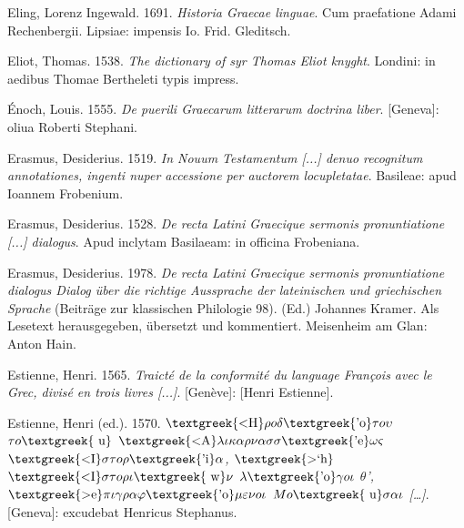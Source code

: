 \begin{styleStandard}
Eling, Lorenz Ingewald. 1691. \textit{Historia Graecae linguae}. Cum praefatione Adami Rechenbergii. Lipsiae: impensis Io. Frid. Gleditsch.
\end{styleStandard}

\begin{styleStandard}
Eliot, Thomas. 1538. \textit{The dictionary of syr Thomas Eliot knyght}. Londini: in aedibus Thomae Bertheleti typis impress.
\end{styleStandard}

\begin{styleStandard}
Énoch, Louis. 1555. \textit{De puerili Graecarum litterarum doctrina liber}. [Geneva]: oliua Roberti Stephani.
\end{styleStandard}

\begin{styleStandard}
Erasmus, Desiderius. 1519. \textit{In Nouum Testamentum [...] denuo recognitum annotationes, ingenti nuper accessione per auctorem locupletatae}. Basileae: apud Ioannem Frobenium.
\end{styleStandard}

\begin{styleStandard}
Erasmus, Desiderius. 1528. \textit{De recta Latini Graecique sermonis pronuntiatione [...] dialogus}. Apud inclytam Basilaeam: in officina Frobeniana.
\end{styleStandard}

\begin{styleStandard}
Erasmus, Desiderius. 1978. \textit{De recta Latini Graecique sermonis pronuntiatione dialogus {\textbar} Dialog über die richtige Aussprache der lateinischen und griechischen Sprache} (Beiträge zur klassischen Philologie 98). (Ed.) Johannes Kramer. Als Lesetext herausgegeben, übersetzt und kommentiert. Meisenheim am Glan: Anton Hain.
\end{styleStandard}

\begin{styleStandard}
Estienne, Henri. 1565. \textit{Traicté de la conformité du language François avec le Grec, divisé en trois livres [...]}. [Genève]: [Henri Estienne].
\end{styleStandard}

\begin{styleStandard}
Estienne, Henri (ed.). 1570. \textit{$\text{\textgreek{<H}}\rho o\delta \text{\textgreek{'o}}\tau o\upsilon $ $\tau o\text{\textgreek{~u}}$ $\text{\textgreek{<A}}\lambda \iota \kappa \alpha \rho \nu \alpha \sigma \sigma \text{\textgreek{'e}}\omega \varsigma $ $\text{\textgreek{<I}}\sigma \tau o\rho \text{\textgreek{'i}}\alpha $, $\text{\textgreek{>`h}}$ $\text{\textgreek{<I}}\sigma \tau o\rho \iota \text{\textgreek{~w}}\nu $ $\lambda \text{\textgreek{'o}}\gamma o\iota $ $\theta $’, $\text{\textgreek{>e}}\pi \iota \gamma \rho \alpha \varphi \text{\textgreek{'o}}\mu \varepsilon \nu o\iota $ $Mo\text{\textgreek{~u}}\sigma \alpha \iota $ […]}. [Geneva]: excudebat Henricus Stephanus.
\end{styleStandard}

